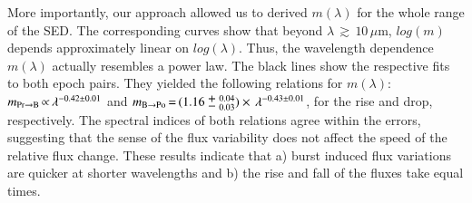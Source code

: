 More importantly, our approach allowed us to derived $m(\lambda)$ for the whole range of the SED. The corresponding curves show that
beyond $\lambda\,{\gtrsim}\,10\,\mu$m, $log(m)$ depends approximately linear on $log(\lambda)$. Thus, the wavelength dependence $m(\lambda)$ actually resembles a power law. The black lines show the respective fits to both epoch pairs. They yielded the following relations for $m(\lambda)$: $m_{\rm Pr \to B}\,{\propto}\, \lambda^{-0.42 \pm 0.01}$ and $m_{\rm B \to Po}\,{=}\, (1.16 \mypm^{0.04}_{0.03})\times \, \lambda^{-0.43 \pm 0.01}$, for the rise and drop, respectively. 
The spectral indices of both relations agree within the errors, suggesting that the sense of the flux variability does not affect the speed of the relative flux change.
These results indicate that a) burst induced flux variations are quicker at shorter wavelengths and b) the rise and fall of the fluxes take equal times.

